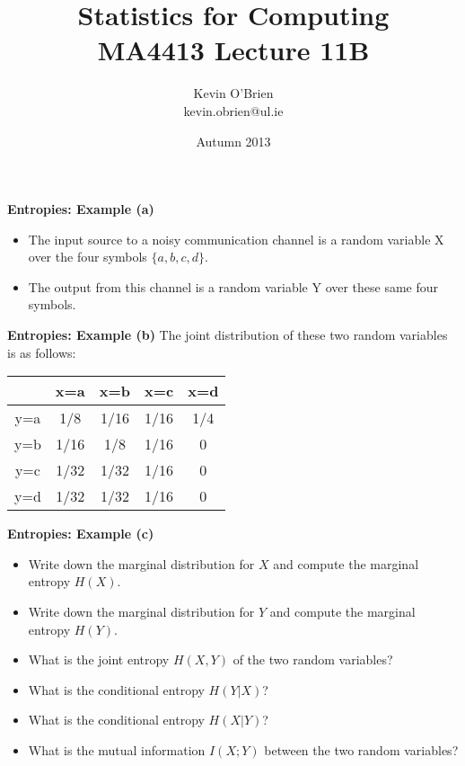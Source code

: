 \documentclass[a4]{beamer}
\title[MA4413]{Statistics for Computing \\ {\normalsize MA4413 Lecture 11B}}
\author[Kevin O'Brien]{Kevin O'Brien \\ {\scriptsize kevin.obrien@ul.ie}}
\date{Autumn 2013}
\institute[Maths \& Stats]{Dept. of Mathematics \& Statistics, \\ University \textit{of} Limerick}
\begin{document}
\titlepage


\noindent \textbf{Entropies: Example (a)}
\begin{itemize}
\item The input source to a noisy communication channel is a random variable X over the
four symbols $\{a, b, c, d\}$. \item  The output from this channel is a random variable Y over these same
four symbols.
\end{itemize}



\noindent \textbf{Entropies: Example (b)}
The joint distribution of these two random variables is as follows:\\ \bigskip
\begin{center}
\begin{tabular}{|c|c|c|c|c|}
\hline
&x=a& x=b & x=c & x=d \\ \hline
y=a &1/8 &1/16 &1/16 &1/4 \\ \hline
y=b &1/16 & 1/8& 1/16& 0 \\ \hline
y=c & 1/32&1/32 & 1/16 & 0\\ \hline
y=d & 1/32& 1/32& 1/16 & 0\\ \hline 
\end{tabular}
\end{center}


\noindent \textbf{Entropies: Example (c)}
\begin{itemize}
\item Write down the marginal distribution for $X$ and compute the marginal entropy $H(X)$.
\item Write down the marginal distribution for $Y$ and compute the marginal entropy $H(Y )$.
\item What is the joint entropy $H(X, Y ) $ of the two random variables?
\item What is the conditional entropy $H(Y|X)$?
\item What is the conditional entropy $H(X|Y)$?
\item What is the mutual information $I(X;Y)$ between the two random variables?
\end{itemize}

\end{document}
